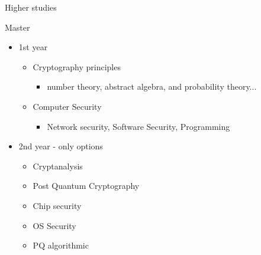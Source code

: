 \documentclass[hyperref={bookmarks=false},aspectratio=169]{beamer}
\begin{document}
\begin{frame}{Higher studies}
\begin{alertblock}{Master}
  \begin{itemize}
    \item 1st year
    \begin{itemize}
      \item Cryptography principles
      \begin{itemize}
        \item number theory, abstract algebra, and probability theory...
      \end{itemize}
      \item Computer Security
      \begin{itemize}
        \item Network security, Software Security, Programming
      \end{itemize} 
    \end{itemize}
  \end{itemize}

  \begin{itemize}
    \item 2nd year - only options
    \begin{itemize}
      \item Cryptanalysis
      \item Post Quantum Cryptography
      \item Chip security
      \item OS Security
      \item PQ algorithmic
    \end{itemize}
  \end{itemize}
\end{alertblock}
\end{frame}
\end{document}
